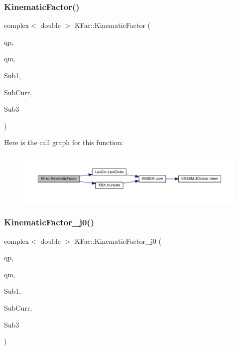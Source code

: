 \subsubsection{\texorpdfstring{KinematicFactor()}{KinematicFactor()}}
{\footnotesize\ttfamily complex$<$ double $>$ K\+Fac\+::\+Kinematic\+Factor (\begin{DoxyParamCaption}\item[{Eigen\+::\+Vector\+Xd \&}]{qp,  }\item[{Eigen\+::\+Vector\+Xd \&}]{qm,  }\item[{Eigen\+::\+Matrix\+Xcd \&}]{Sub1,  }\item[{Eigen\+::\+Matrix\+Xcd \&}]{Sub\+Curr,  }\item[{Eigen\+::\+Matrix\+Xcd \&}]{Sub3 }\end{DoxyParamCaption})}

Here is the call graph for this function\+:\nopagebreak
\begin{figure}[H]
\begin{center}
\leavevmode
\includegraphics[width=350pt]{d2/d89/namespaceKFac_a56130e258872427e83c530a5a471cf5c_cgraph}
\end{center}
\end{figure}
\mbox{\label{namespaceKFac_a6f8f443ade2532c958e4dc168d7da1c7}} 
\subsubsection{\texorpdfstring{KinematicFactor\_j0()}{KinematicFactor\_j0()}}
{\footnotesize\ttfamily complex$<$ double $>$ K\+Fac\+::\+Kinematic\+Factor\+\_\+j0 (\begin{DoxyParamCaption}\item[{Eigen\+::\+Vector\+Xd \&}]{qp,  }\item[{Eigen\+::\+Vector\+Xd \&}]{qm,  }\item[{Eigen\+::\+Matrix\+Xcd \&}]{Sub1,  }\item[{Eigen\+::\+Matrix\+Xcd \&}]{Sub\+Curr,  }\item[{Eigen\+::\+Matrix\+Xcd \&}]{Sub3 }\end{DoxyParamCaption})}

